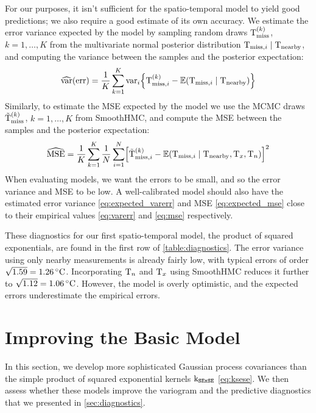 \documentclass[12pt]{article}
\begin{document}
For our purposes, it isn't sufficient for the spatio-temporal model to yield good predictions; we also require a good estimate of its own accuracy.
We estimate the error variance expected by the model by sampling random draws \(\mathrm{T}^{(k)}_{\mathrm{miss}}\), \(k=1,\dotsc,K\) from the multivariate normal posterior distribution \(\mathrm{T}_{\mathrm{miss},i} \mid \mathrm{T}_{\mathrm{nearby}}\), and computing the variance between the samples and the posterior expectation:
\begin{equation}
\widehat{\var}\del{\error} = \frac{1}{K} \sum_{k=1}^K \var_i \cbr{\T^{(k)}_{\miss,i} - \E\del{\T_{\miss,i} \mid \T_\obs}}
\label{eq:expected_varerr}
\end{equation}
Similarly, to estimate the MSE expected by the model we use the MCMC draws \(\tilde{\mathrm{T}}^{(k)}_{\mathrm{miss}}\), \(k=1,\dotsc,K\) from SmoothHMC, and compute the MSE between the samples and the posterior expectation:
\begin{equation}
    \widehat{\mse} = \frac{1}{K} \sum_{k=1}^K \frac{1}{N} \sum_{i=1}^N \sbr{\tilde\T^{(k)}_{\miss,i} - \E\del{\T_{\miss,i} \mid \T_\obs,\Tx,\Tn}}^2
\label{eq:expected_mse}
\end{equation}
When evaluating models, we want the errors to be small, and so the error variance and MSE to be low. 
A well-calibrated model should also have the estimated error variance \autoref{eq:expected_varerr} and MSE \autoref{eq:expected_mse} close to their empirical values \autoref{eq:varerr} and \autoref{eq:mse} respectively.

These diagnostics for our first spatio-temporal model, the product of squared exponentials, are found in the first row of \autoref{table:diagnostics}. The error variance using only nearby measurements is already fairly low, with typical errors of order \(\sqrt{1.59}=1.26\,{}^{\circ}\mathrm{C}\). Incorporating \(\mathrm{T}_{n}\) and \(\mathrm{T}_{x}\) using SmoothHMC reduces it further to \(\sqrt{1.12}=1.06\,{}^{\circ}\mathrm{C}\). 
However, the model is overly optimistic, and the expected errors underestimate the empirical errors.

\section{Improving the Basic Model}
\label{sec:improving_model}

In this section, we develop more sophisticated Gaussian process covariances than the simple product of squared exponential kernels \(\operatorname{k_{\mathtt{SExSE}}}\) \autoref{eq:ksese}. 
We then assess whether these models improve the variogram and the predictive diagnostics that we presented in \autoref{sec:diagnostics}.
\end{document}
